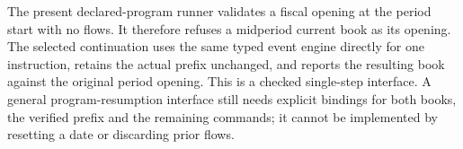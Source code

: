 The present declared-program runner validates a fiscal opening at the period start with no flows. It therefore refuses a midperiod current book as its opening. The selected continuation uses the same typed event engine directly for one instruction, retains the actual prefix unchanged, and reports the resulting book against the original period opening. This is a checked single-step interface. A general program-resumption interface still needs explicit bindings for both books, the verified prefix and the remaining commands; it cannot be implemented by resetting a date or discarding prior flows.
